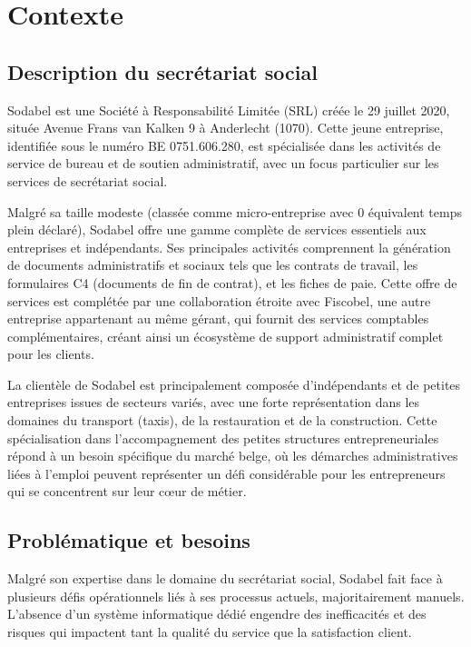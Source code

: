 \chapter{Contexte}

\section{Description du secrétariat social}

Sodabel est une Société à Responsabilité Limitée (SRL) créée le 29 juillet 2020, située Avenue Frans van Kalken 9 à Anderlecht (1070). Cette jeune entreprise, identifiée sous le numéro BE 0751.606.280, est spécialisée dans les activités de service de bureau et de soutien administratif, avec un focus particulier sur les services de secrétariat social.

Malgré sa taille modeste (classée comme micro-entreprise avec 0 équivalent temps plein déclaré), Sodabel offre une gamme complète de services essentiels aux entreprises et indépendants. Ses principales activités comprennent la génération de documents administratifs et sociaux tels que les contrats de travail, les formulaires C4 (documents de fin de contrat), et les fiches de paie. Cette offre de services est complétée par une collaboration étroite avec Fiscobel, une autre entreprise appartenant au même gérant, qui fournit des services comptables complémentaires, créant ainsi un écosystème de support administratif complet pour les clients.

La clientèle de Sodabel est principalement composée d'indépendants et de petites entreprises issues de secteurs variés, avec une forte représentation dans les domaines du transport (taxis), de la restauration et de la construction. Cette spécialisation dans l'accompagnement des petites structures entrepreneuriales répond à un besoin spécifique du marché belge, où les démarches administratives liées à l'emploi peuvent représenter un défi considérable pour les entrepreneurs qui se concentrent sur leur cœur de métier.

\section{Problématique et besoins}

Malgré son expertise dans le domaine du secrétariat social, Sodabel fait face à plusieurs défis opérationnels liés à ses processus actuels, majoritairement manuels. L'absence d'un système informatique dédié engendre des inefficacités et des risques qui impactent tant la qualité du service que la satisfaction client.

